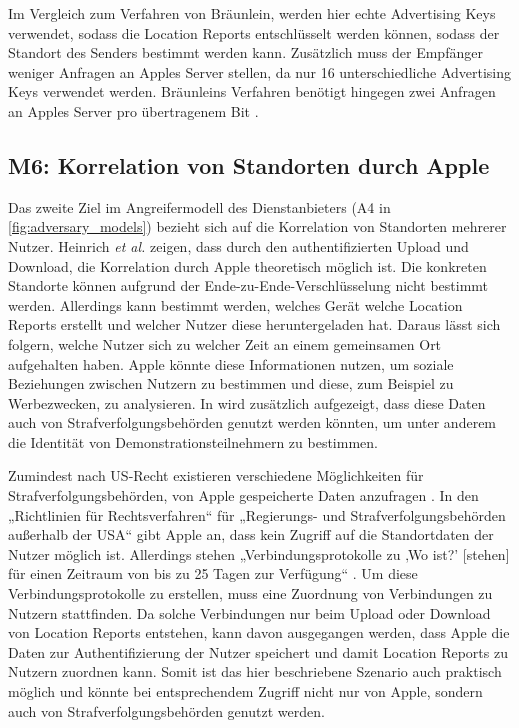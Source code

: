 Im Vergleich zum Verfahren von Bräunlein, werden hier echte Advertising Keys verwendet, sodass die Location Reports entschlüsselt werden können, sodass der Standort des Senders bestimmt werden kann.
Zusätzlich muss der Empfänger weniger Anfragen an Apples Server stellen, da nur 16 unterschiedliche Advertising Keys verwendet werden.
Bräunleins Verfahren benötigt hingegen zwei Anfragen an Apples Server pro übertragenem Bit \cite{braeunlein_sendmy}.


\subsection[M6]{M6: Korrelation von Standorten durch Apple}
\label{missbrauch:6}

Das zweite Ziel im Angreifermodell des Dienstanbieters (A4 in \autoref{fig:adversary_models}) bezieht sich auf die Korrelation von Standorten mehrerer Nutzer.
Heinrich \textit{et al.} \cite{Heinrich_FindMy} zeigen, dass durch den authentifizierten Upload und Download, die Korrelation durch Apple theoretisch möglich ist.
Die konkreten Standorte können aufgrund der Ende-zu-Ende-Verschlüsselung nicht bestimmt werden.
Allerdings kann bestimmt werden, welches Gerät welche Location Reports erstellt und welcher Nutzer diese heruntergeladen hat.
Daraus lässt sich folgern, welche Nutzer sich zu welcher Zeit an einem gemeinsamen Ort aufgehalten haben.
Apple könnte diese Informationen nutzen, um soziale Beziehungen zwischen Nutzern zu bestimmen und diese, zum Beispiel zu Werbezwecken, zu analysieren.
In \cite{Heinrich_FindMy} wird zusätzlich aufgezeigt, dass diese Daten auch von Strafverfolgungsbehörden genutzt werden könnten, um unter anderem die Identität von Demonstrationsteilnehmern zu bestimmen.

Zumindest nach US-Recht existieren verschiedene Möglichkeiten für Strafverfolgungsbehörden, von Apple gespeicherte Daten anzufragen \cite{Data_Access}.
In den „Richtlinien für Rechtsverfahren“ für „Regierungs- und Strafverfolgungsbehörden außerhalb der USA“ \cite{Apple_FindMy_Data} gibt Apple an, dass kein Zugriff auf die Standortdaten der Nutzer möglich ist.
Allerdings stehen „Verbindungsprotokolle zu ‚Wo ist?’ [stehen] für einen Zeitraum von bis zu 25 Tagen zur Verfügung“ \cite{Apple_FindMy_Data}.
Um diese Verbindungsprotokolle zu erstellen, muss eine Zuordnung von Verbindungen zu Nutzern stattfinden.
Da solche Verbindungen nur beim Upload oder Download von Location Reports entstehen, kann davon ausgegangen werden, dass Apple die Daten zur Authentifizierung der Nutzer speichert und damit Location Reports zu Nutzern zuordnen kann.
Somit ist das hier beschriebene Szenario auch praktisch möglich und könnte bei entsprechendem Zugriff nicht nur von Apple, sondern auch von Strafverfolgungsbehörden genutzt werden.



